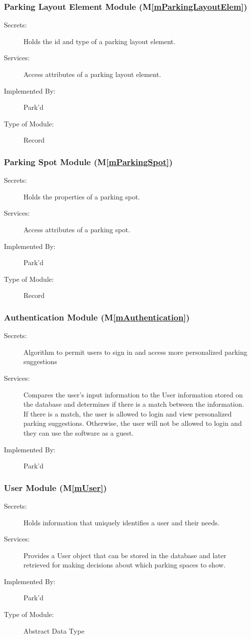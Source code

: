 \documentclass[12pt, titlepage]{article}
\newcommand{\mref}[1]{M\ref{#1}}
\begin{document}
\subsubsection{Parking Layout Element Module (\mref{mParkingLayoutElem})}
\begin{description}
\item[Secrets:] Holds the id and type of a parking layout element.
\item[Services:] Access attributes of a parking layout element.
\item[Implemented By:] Park'd
\item[Type of Module:] Record
\end{description}

\subsubsection{Parking Spot Module (\mref{mParkingSpot})}
\begin{description}
\item[Secrets:] Holds the properties of a parking spot.
\item[Services:] Access attributes of a parking spot.
\item[Implemented By:] Park'd
\item[Type of Module:] Record
\end{description}

\subsubsection{Authentication Module (\mref{mAuthentication})}
\begin{description}
\item[Secrets:] Algorithm to permit users to sign in and access more
personalized parking suggestions  
\item[Services:] Compares the user's input information to the User information
stored on the database and determines if there is a match between the
information. If there is a match, the user is allowed to login and view
personalized parking suggestions. Otherwise, the user will not be allowed to
login and they can use the software as a guest.
\item[Implemented By:] Park'd
\end{description}

\subsubsection{User Module (\mref{mUser})}
\begin{description}
\item[Secrets:] Holds information that uniquely identifies a user and their
needs.
\item[Services:] Provides a User object that can be stored in the database and
later retrieved for making decisions about which parking spaces to show.
\item[Implemented By:] Park'd
\item[Type of Module:] Abstract Data Type
\end{description}
\end{document}
